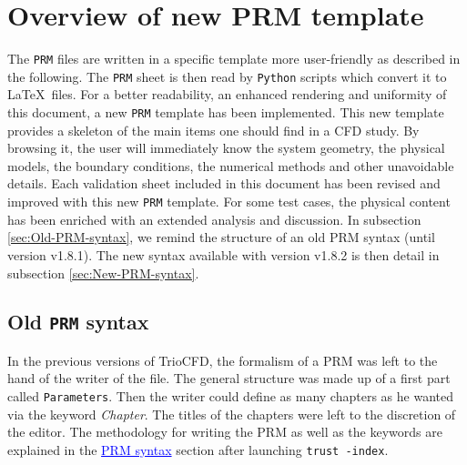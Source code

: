 \chapter{\label{chap:New-PRM-syntax}Overview of new \textsf{PRM} template}
The \texttt{PRM} files are written in a specific template 
more user-friendly as described in the following.
The \texttt{PRM} sheet is then read by \texttt{Python} scripts which
convert it to \LaTeX~files.\smallskip\newline
For a better readability, an enhanced rendering and uniformity of
this document, a new \texttt{PRM} template has been implemented. This
new template provides a skeleton of the main items one should find in a CFD
study. By browsing it, the user will immediately know the system geometry,
the physical models, the boundary conditions, the numerical methods
and other unavoidable details. Each validation sheet included in this document
has been revised and improved with this new \texttt{PRM} template.
For some test cases, the physical content has been enriched with an extended
analysis and discussion. In subsection \ref{sec:Old-PRM-syntax},
we remind the structure of an old \textsf{PRM} syntax
(until version \textsf{v1.8.1}). The new syntax available with version \textsf{v1.8.2}
is then detail in subsection \ref{sec:New-PRM-syntax}.

\section{\label{sec:Old-PRM-syntax}Old \texttt{PRM} syntax}
In the previous versions of TrioCFD, the formalism of a PRM was left to the hand of the writer of the file. 
The general structure was made up of a first part called \texttt{Parameters}. Then the writer could define as many chapters as he wanted via the keyword \textit{Chapter}.
The titles of the chapters were left to the discretion of the editor.
The methodology for writing the PRM as well as the keywords are explained in the \textcolor{blue}{\underline{PRM syntax}} section after launching \verb "trust -index".\newline \newline

